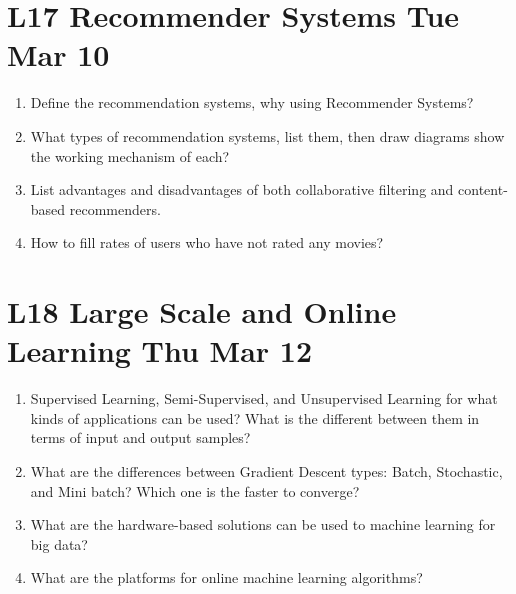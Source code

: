 \documentclass[12pt]{article}
\newenvironment{QandA}{\begin{enumerate}[label=\bfseries\arabic*.]\bfseries}
{\end{enumerate}}
\newenvironment{answered}{\par\normalfont\color{Sepia}}{}
\begin{document}
\section*{L17 Recommender Systems \textemdash{} Tue Mar 10}
\begin{QandA}
    \item Define the recommendation systems, why using Recommender Systems?
    \begin{answered}
    \end{answered}
    
    \item What types of recommendation systems, list them, then draw diagrams show the working mechanism of each?
    \begin{answered}
    \end{answered}
    
    \item List advantages and disadvantages of both collaborative filtering and content-based recommenders.
    \begin{answered}
    \end{answered}
    
    \item How to fill rates of users who have not rated any movies?
    \begin{answered}
    \end{answered}

\end{QandA}

\section*{L18 Large Scale and Online Learning  \textemdash{} Thu Mar 12}
\begin{QandA}
    \item Supervised Learning, Semi-Supervised, and Unsupervised Learning for what kinds of applications can be used? 
          What is the different between them in terms of input and output samples?
    \begin{answered}
    \end{answered}
      
          
    \item What are the differences between Gradient Descent types: Batch, Stochastic, and Mini batch? 
          Which one is the faster to converge? 
    \begin{answered}
    \end{answered}
      
          
    \item What are the hardware-based solutions can be used to machine learning for big data? 
    \begin{answered}
    \end{answered}
    
    \item What are the platforms for online machine learning algorithms?
    \begin{answered}
    \end{answered}

\end{QandA}
\end{document}
